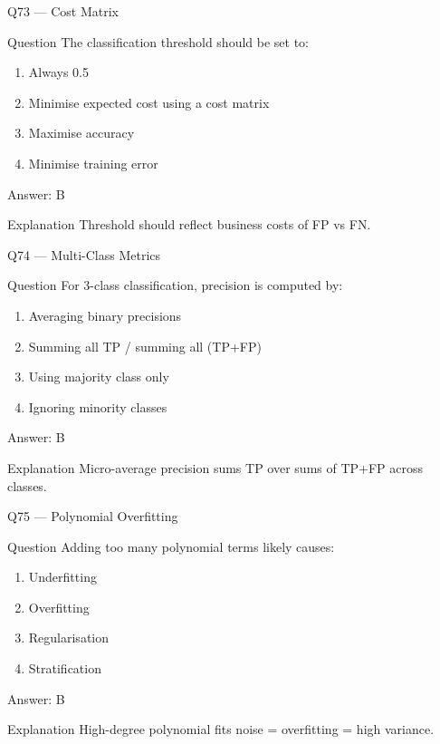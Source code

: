 \documentclass[aspectratio=169,8pt]{beamer}
\begin{document}
	\begin{frame}{Q73 --- Cost Matrix}
		\begin{block}{Question}
			The classification threshold should be set to:
		\end{block}
		\begin{enumerate}
			\item Always 0.5
			\item Minimise expected cost using a cost matrix
			\item Maximise accuracy
			\item Minimise training error
		\end{enumerate}
		\begin{exampleblock}{Answer: B}\end{exampleblock}
		\begin{block}{Explanation}
			Threshold should reflect business costs of FP vs FN.
		\end{block}
	\end{frame}
	
	\begin{frame}{Q74 --- Multi-Class Metrics}
		\begin{block}{Question}
			For 3-class classification, precision is computed by:
		\end{block}
		\begin{enumerate}
			\item Averaging binary precisions
			\item Summing all TP / summing all (TP+FP)
			\item Using majority class only
			\item Ignoring minority classes
		\end{enumerate}
		\begin{exampleblock}{Answer: B}\end{exampleblock}
		\begin{block}{Explanation}
			Micro-average precision sums TP over sums of TP+FP across classes.
		\end{block}
	\end{frame}
	
	\begin{frame}{Q75 --- Polynomial Overfitting}
		\begin{block}{Question}
			Adding too many polynomial terms likely causes:
		\end{block}
		\begin{enumerate}
			\item Underfitting
			\item Overfitting
			\item Regularisation
			\item Stratification
		\end{enumerate}
		\begin{exampleblock}{Answer: B}\end{exampleblock}
		\begin{block}{Explanation}
			High-degree polynomial fits noise = overfitting = high variance.
		\end{block}
	\end{frame}
	
\end{document}
